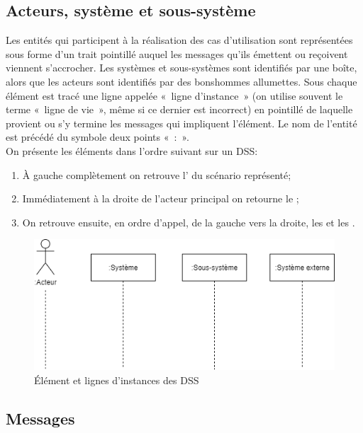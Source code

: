\subsection{Acteurs, système et sous-système}

Les entités qui participent à la réalisation des cas d'utilisation sont représentées sous forme d'un trait pointillé auquel les messages qu'ils émettent ou reçoivent viennent s'accrocher. Les systèmes et sous-systèmes sont identifiés par une boîte, alors que les acteurs sont identifiés par des bonshommes allumettes. Sous chaque élément est tracé une ligne appelée «~ligne d'instance~» (on utilise souvent le terme «~ligne de vie~», même si ce dernier est incorrect) en pointillé de laquelle provient ou s'y termine les messages qui impliquent l'élément. Le nom de l'entité est précédé du symbole deux points «~:~».\\

On présente les éléments dans l'ordre suivant sur un \acrshort{DSS}:
\begin{enumerate}
	\item À gauche complètement on retrouve l' du scénario représenté;
	\item Immédiatement à la droite de l'acteur principal on retourne le ;
	\item On retrouve ensuite, en ordre d'appel, de la gauche vers la droite, les  et les .
\end{enumerate}

\begin{figure}[H]
	\caption{Élément et lignes d'instances des \acrshort{DSS}}
	\centering
	\includegraphics[scale=0.6]{dss-element.png}
\end{figure}

\subsection{Messages}


